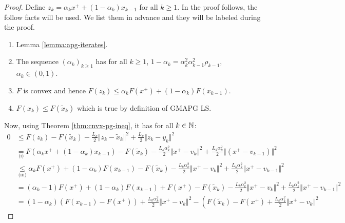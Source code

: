 \documentclass[12pt]{report}
\begin{document}
        \begin{proof}
            Define $z_k = \alpha_k x^+ + (1 - \alpha_k)x_{k - 1}$ for all $k \ge 1$. 
            In the proof follows, the follow facts will be used. 
            We list them in advance and they will be labeled during the proof. 
            \begin{enumerate}
                \item Lemma \ref{lemma:apg-iterates}. 
                \item The sequence $(\alpha_k)_{k \ge 1}$ has for all $k \ge 1$, $1 - \alpha_k = \alpha_k^2\alpha_{k - 1}^2\rho_{k - 1}$, $\alpha_k \in (0, 1)$. 
                \item $F$ is convex and hence $F(z_k) \le \alpha_k F(x^+) + (1 - \alpha_k)F(x_{k - 1})$. 
                \item $F(x_k) \le F(\tilde x_k)$ which is true by definition of GMAPG LS. 
            \end{enumerate}
            Now, using Theorem \ref{thm:cnvx-pg-ineq}, it has for all $k \in \mathbb N$: 
            {\allowdisplaybreaks\small
            \begin{align*}
                0 &\le 
                F(z_k) 
                - F(\tilde x_k) - \frac{L_k}{2}\Vert z_k - \tilde x_k\Vert^2 + 
                \frac{L_k}{2}\Vert z_k - y_k\Vert^2
                \\
                &\underset{\text{(i)}}{=}
                F(\alpha_k x^+ + (1 - \alpha_k)x_{k - 1}) - F(\tilde x_k)
                - \frac{L_k\alpha_k^2}{2}\Vert x^+ - v_k \Vert^2 
                + \frac{L_k\alpha_k^2}{2}\Vert(x^+ - v_{k - 1})\Vert^2
                \\
                &\underset{\text{(iii)}}{\le} 
                \alpha_k F(x^+) + (1 - \alpha_k) F(x_{k - 1}) - F(\tilde x_k)
                - \frac{L_k\alpha_k^2}{2}\Vert x^+ - v_k \Vert^2 
                + \frac{L_k\alpha_k^2}{2}\Vert x^+ - v_{k - 1} \Vert^2
                \\
                &= 
                (\alpha_k - 1)F(x^+) + (1 - \alpha_k) F(x_{k - 1}) + F(x^+) - F(\tilde x_k)
                - \frac{L_k\alpha_k^2}{2}\Vert x^+ - v_k \Vert^2 
                + \frac{L_k\alpha_k^2}{2}\Vert x^+ - v_{k - 1}\Vert^2
                \\
                &= 
                (1 - \alpha_k)(F(x_{k - 1}) - F(x^+)) + \frac{L_k\alpha_k^2}{2}\Vert x^+ - v_k\Vert^2
                - \left(
                    F(\tilde x_k) - F(x^+) + \frac{L_k\alpha_k^2}{2}\Vert x^+ - v_k\Vert^2

\end{align*}}
\end{proof}
\end{document}
